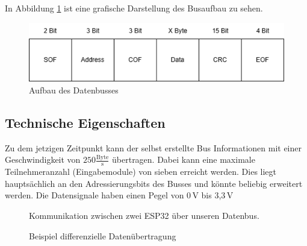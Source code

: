 In Abbildung \ref{Datenbus} ist eine grafische Darstellung des Busaufbau zu sehen.
\begin{figure}[H]
	\centering    
	\includegraphics[width=1\textwidth]{Bilder/datenbus.png}
	\caption{Aufbau des Datenbusses}
	\label{Datenbus}
\end{figure}

\subsection{Technische Eigenschaften}
Zu dem jetzigen Zeitpunkt kann der selbst erstellte Bus Informationen mit einer Geschwindigkeit von $250\frac{\mathrm{Byte}}{\mathrm{s}}$ übertragen. Dabei kann eine maximale Teilnehmeranzahl (Eingabemodule) von sieben erreicht werden. Dies liegt hauptsächlich an den Adressierungsbits des Busses und könnte beliebig erweitert werden. Die Datensignale haben einen Pegel von 0\,\si{V} bis 3,3\,\si{V}

\begin{figure}[H]
    \centering    
    \caption{Kommunikation zwischen zwei ESP32 über unseren Datenbus.}
    \label{zeitplan}
\end{figure}

\begin{figure}[H]
    \centering    
    \caption{Beispiel differenzielle Datenübertragung}
    \label{beispielDatenübertragung}
\end{figure}

